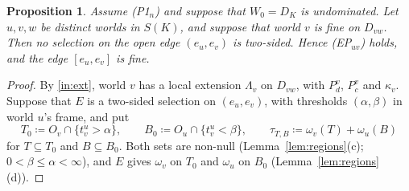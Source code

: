 \documentclass[11pt]{article}
\newtheorem{proposition}[theorem]{Proposition}
\theoremstyle{definition}\newtheorem{definition}[theorem]{Definition}
\theoremstyle{remark}\newtheorem{remark}[theorem]{Remark}
\begin{document}
\begin{proposition}\label{prop:partner}
Assume (P1$_n$) and suppose that $W_0=D_K$ is undominated. Let $u,v,w$ be
distinct worlds in $S(K)$, and suppose that world $v$ is fine on $D_{vw}$.
Then no selection on the open edge $(e_u,e_v)$ is two-sided. Hence
(EP$_{uv}$) holds, and the edge $[e_u,e_v]$ is fine.
\end{proposition}
\begin{proof}
By \ref{in:ext}, world $v$ has a local extension $\Lambda_v$ on $D_{vw}$,
with $P^v_d$, $P^v_c$ and $\kappa_v$. Suppose that $E$ is a two-sided
selection on $(e_u,e_v)$, with thresholds $(\alpha,\beta)$ in world $u$'s
frame, and put
\[
 T_0\coloneqq O_v\cap\{t^u_v>\alpha\},\qquad
 B_0\coloneqq O_u\cap\{t^u_v<\beta\},\qquad
 \tau_{T,B}\coloneqq\omega_v(T)+\omega_u(B)
\]
for $T\subseteq T_0$ and $B\subseteq B_0$. Both sets are non-null
(Lemma~\ref{lem:regions}(c); $0<\beta\le\alpha<\infty$), and $E$ gives
$\omega_v$ on $T_0$ and $\omega_u$ on $B_0$ (Lemma~\ref{lem:regions}(d)).


\end{proof}
\end{document}
